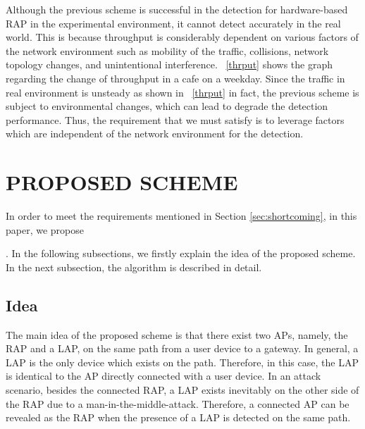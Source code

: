 \documentclass[conference]{IEEEtran}
\begin{document}
Although the previous scheme is successful in the detection for hardware-based RAP in the experimental environment, it cannot detect accurately in the real world.
This is because throughput is considerably dependent on various factors of the network environment such as mobility of the traffic, collisions, network topology changes, and unintentional interference.
\figurename~\ref{thrput} shows the graph regarding the change of throughput in a cafe on a weekday.
Since the traffic in real environment is unsteady as shown in \figurename~\ref{thrput} in fact, the previous scheme is subject to environmental changes, which can lead to degrade the detection performance.
Thus, the requirement that we must satisfy is to leverage factors which are independent of the network environment for the detection.

\section{PROPOSED SCHEME}\label{sec:4}
In order to meet the requirements mentioned in Section \ref{sec:shortcoming}, in this paper, we propose \title{}.
In the following subsections, we firstly explain the idea of the proposed scheme.
In the next subsection, the algorithm is described in detail.

\subsection{Idea}
The main idea of the proposed scheme is that there exist two APs, namely, the RAP and a LAP, on the same path from a user device to a gateway.
In general, a LAP is the only device which exists on the path.
Therefore, in this case, the LAP is identical to the AP directly connected with a user device.
In an attack scenario, besides the connected RAP, a LAP exists inevitably on the other side of the RAP due to a man-in-the-middle-attack.
Therefore, a connected AP can be revealed as the RAP when the presence of a LAP is detected on the same path.
\end{document}
